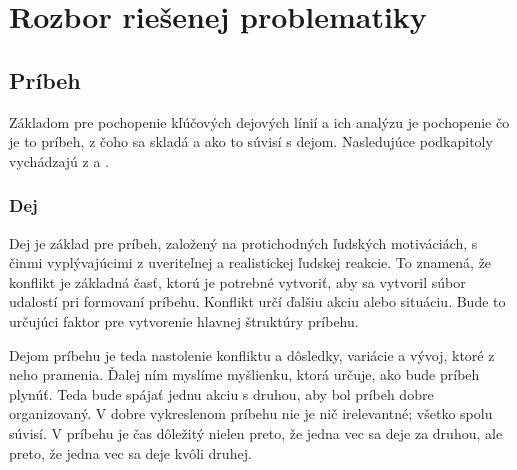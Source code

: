 \chapter{Rozbor riešenej problematiky }
\label{teoria}


\section{Príbeh}
Základom pre pochopenie kľúčových dejových línií a ich analýzu je pochopenie čo je to príbeh, z čoho sa skladá a ako to súvisí s dejom. Nasledujúce podkapitoly vychádzajú \linebreak
z \cite{Rosaria:2004} a \cite{Roberts:1987}.

\subsection*{Dej}

Dej je základ pre príbeh, založený na protichodných ľudských motiváciách, s činmi vyplývajúcimi z uveriteľnej a realistickej ľudskej reakcie. To znamená, že konflikt je základná časť, ktorú je potrebné vytvoriť, aby sa vytvoril súbor udalostí pri formovaní príbehu. Konflikt určí ďalšiu akciu alebo situáciu. Bude to určujúci faktor pre vytvorenie hlavnej štruktúry príbehu.
 
Dejom príbehu je teda nastolenie konfliktu a dôsledky, variácie a vývoj, ktoré z neho pramenia. Ďalej ním myslíme myšlienku, ktorá určuje, ako bude príbeh plynúť. Teda bude spájať jednu akciu s druhou, aby bol príbeh dobre organizovaný. V dobre vykreslenom príbehu nie je nič irelevantné; všetko spolu súvisí. V príbehu je čas dôležitý nielen preto, že jedna vec sa deje za druhou, ale preto, že jedna vec sa deje kvôli druhej.

